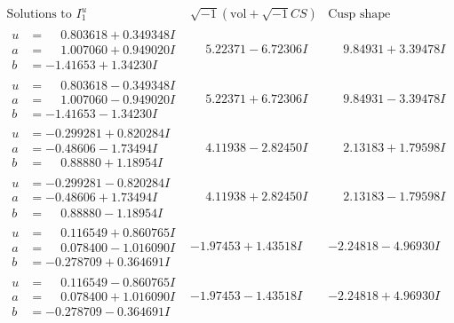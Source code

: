 \documentclass[1p]{elsarticle_modified}
\theoremstyle{definition}
\newcommand{\I}{\sqrt{-1}}
\begin{document}
$$\begin{array}{c|c|c}  
\text{Solutions to }I^u_{1}& \I (\text{vol} + \sqrt{-1}CS) & \text{Cusp shape}\\
 \hline 
\begin{aligned}
u &= \phantom{-}0.803618 + 0.349348 I \\
a &= \phantom{-}1.007060 + 0.949020 I \\
b &= -1.41653 + 1.34230 I\end{aligned}
 & \phantom{-}5.22371 - 6.72306 I & \phantom{-}9.84931 + 3.39478 I \\ \hline\begin{aligned}
u &= \phantom{-}0.803618 - 0.349348 I \\
a &= \phantom{-}1.007060 - 0.949020 I \\
b &= -1.41653 - 1.34230 I\end{aligned}
 & \phantom{-}5.22371 + 6.72306 I & \phantom{-}9.84931 - 3.39478 I \\ \hline\begin{aligned}
u &= -0.299281 + 0.820284 I \\
a &= -0.48606 - 1.73494 I \\
b &= \phantom{-}0.88880 + 1.18954 I\end{aligned}
 & \phantom{-}4.11938 - 2.82450 I & \phantom{-}2.13183 + 1.79598 I \\ \hline\begin{aligned}
u &= -0.299281 - 0.820284 I \\
a &= -0.48606 + 1.73494 I \\
b &= \phantom{-}0.88880 - 1.18954 I\end{aligned}
 & \phantom{-}4.11938 + 2.82450 I & \phantom{-}2.13183 - 1.79598 I \\ \hline\begin{aligned}
u &= \phantom{-}0.116549 + 0.860765 I \\
a &= \phantom{-}0.078400 - 1.016090 I \\
b &= -0.278709 + 0.364691 I\end{aligned}
 & -1.97453 + 1.43518 I & -2.24818 - 4.96930 I \\ \hline\begin{aligned}
u &= \phantom{-}0.116549 - 0.860765 I \\
a &= \phantom{-}0.078400 + 1.016090 I \\
b &= -0.278709 - 0.364691 I\end{aligned}
 & -1.97453 - 1.43518 I & -2.24818 + 4.96930 I \\ \hline\begin{aligned}

\end{aligned}
\end{array}$$
\end{document}

